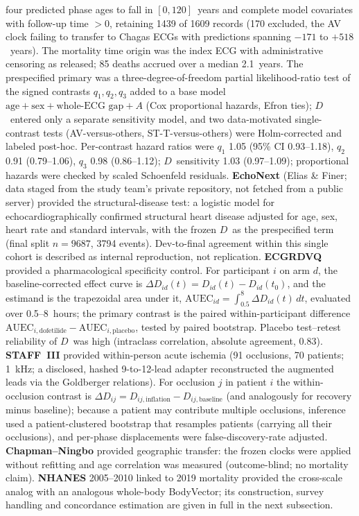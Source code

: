 \documentclass[11pt]{article}
\newcommand{\D}{\ensuremath{D}}
\newcommand{\A}{\ensuremath{A}}
\begin{document}
four predicted phase ages to fall in $[0,120]$~years and complete model covariates with
follow-up time ${>}0$, retaining \num{1439} of \num{1609} records (\num{170} excluded, the
AV clock failing to transfer to Chagas ECGs with predictions spanning $-171$ to
$+518$~years). The mortality time origin was the index ECG with administrative censoring as
released; \num{85} deaths accrued over a median \num{2.1}~years. The prespecified primary
was a three-degree-of-freedom partial likelihood-ratio test of the signed contrasts
$q_1,q_2,q_3$ added to a base model $\text{age}+\text{sex}+\text{whole-ECG gap}+\A$ (Cox
proportional hazards, Efron ties); \D\ entered only a separate sensitivity model, and two
data-motivated single-contrast tests (AV-versus-others, ST-T-versus-others) were Holm-corrected
and labeled post-hoc. Per-contrast hazard ratios were $q_1$ \num{1.05} (95\% CI
\numrange{0.93}{1.18}), $q_2$ \num{0.91} (\numrange{0.79}{1.06}), $q_3$ \num{0.98}
(\numrange{0.86}{1.12}); \D\ sensitivity \num{1.03} (\numrange{0.97}{1.09}); proportional
hazards were checked by scaled Schoenfeld residuals. \textbf{EchoNext} (Elias \& Finer; data staged from the study
team's private repository, not fetched from a public server) \citep{echonext,poterucha2025} provided
the structural-disease test: a logistic model for
echocardiographically confirmed structural heart disease adjusted for age, sex, heart
rate and standard intervals, with the frozen \D\ as the prespecified term (final split
$n=\num{9687}$, \num{3794} events). Dev-to-final agreement within this single cohort is
described as internal reproduction, not replication. \textbf{ECGRDVQ} \citep{ecgrdvq,johannesen2014}
provided a pharmacological specificity control. For participant $i$ on arm $d$, the
baseline-corrected effect curve is $\Delta\D_{id}(t)=\D_{id}(t)-\D_{id}(t_0)$, and the
estimand is the trapezoidal area under it,
$\text{AUEC}_{id}=\int_{0.5}^{8}\Delta\D_{id}(t)\,dt$, evaluated over
\numrange{0.5}{8}~hours; the primary contrast is the paired within-participant difference
$\text{AUEC}_{i,\text{dofetilide}}-\text{AUEC}_{i,\text{placebo}}$, tested by paired
bootstrap. Placebo test--retest reliability of \D\ was high (intraclass correlation,
absolute agreement, \num{0.83}). \textbf{STAFF~III} \citep{staff,martinez2017} provided
within-person acute ischemia (\num{91} occlusions, \num{70} patients; \SI{1}{\kilo\hertz};
a disclosed, hashed 9-to-12-lead adapter reconstructed the augmented leads via the
Goldberger relations). For occlusion $j$ in patient $i$ the within-occlusion contrast is
$\Delta\D_{ij}=\D_{ij,\text{inflation}}-\D_{ij,\text{baseline}}$ (and analogously for
recovery minus baseline); because a patient may contribute multiple occlusions, inference
used a patient-clustered bootstrap that resamples patients (carrying all their
occlusions), and per-phase displacements were false-discovery-rate adjusted. \textbf{Chapman--Ningbo} \citep{chapman} provided
geographic transfer: the frozen clocks were applied without refitting and age
correlation was measured (outcome-blind; no mortality claim). \textbf{NHANES} 2005--2010 linked to 2019 mortality \citep{nhanes} provided the
cross-scale analog with an analogous whole-body BodyVector; its construction,
survey handling and concordance estimation are given in full in the next subsection.
\end{document}
